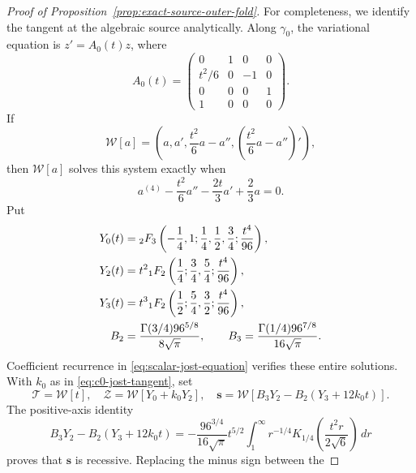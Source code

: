 \documentclass[11pt]{amsart}
\numberwithin{equation}{section}
\theoremstyle{definition}
\theoremstyle{remark}
\begin{document}
\begin{proof}[Proof of Proposition~\ref{prop:exact-source-outer-fold}]
For completeness, we identify the tangent at the algebraic source
analytically.  Along
$\gamma_0$, the variational equation is $z'=A_0(t)z$, where
\begin{equation}\label{eq:algebraic-variational-matrix}
 A_0(t)=
 \begin{pmatrix}
 0&1&0&0\\ t^2/6&0&-1&0\\
 0&0&0&1\\ 1&0&0&0
 \end{pmatrix}.
\end{equation}
If
\begin{equation}\label{eq:scalar-jost-lift}
 \mathcal W[a]=
 \left(a,a',\frac{t^2}{6}a-a'',
       \left(\frac{t^2}{6}a-a''\right)'\right),
\end{equation}
then $\mathcal W[a]$ solves this system exactly when
\begin{equation}\label{eq:scalar-jost-equation}
 a^{(4)}-\frac{t^2}{6}a''-\frac{2t}{3}a'
       +\frac23a=0.
\end{equation}
Put
\begin{align}
 Y_0(t)&={}_2F_3\left(
  -\frac14,1;\frac14,\frac12,\frac34;\frac{t^4}{96}\right),
 \notag\\
 Y_2(t)&=t^2{}_1F_2\left(
  \frac14;\frac34,\frac54;\frac{t^4}{96}\right),\notag\\
 Y_3(t)&=t^3{}_1F_2\left(
  \frac12;\frac54,\frac32;\frac{t^4}{96}\right),
 \label{eq:exact-jost-scalars}\\
 B_2&=\frac{\Gamma(3/4)96^{5/8}}{8\sqrt\pi},
 \qquad
 B_3=\frac{\Gamma(1/4)96^{7/8}}{16\sqrt\pi}.\notag
\end{align}
Coefficient recurrence in \eqref{eq:scalar-jost-equation} verifies these
entire solutions.  With $k_0$ as in \eqref{eq:c0-jost-tangent}, set
\begin{equation}\label{eq:exact-jost-basis}
 \mathcal T=\mathcal W[t],\quad
 \mathcal Z=\mathcal W[Y_0+k_0Y_2],\quad
 \mathbf s=\mathcal W[B_3Y_2-B_2(Y_3+12k_0t)].
\end{equation}
The positive-axis identity
\begin{equation}\label{eq:recessive-bessel-representation}
 B_3Y_2-B_2(Y_3+12k_0t)
 =-\frac{96^{3/4}}{16\sqrt\pi}t^{5/2}
   \int_1^\infty r^{-1/4}
     K_{1/4}\!\left(\frac{t^2r}{2\sqrt6}\right)\,dr
\end{equation}
proves that $\mathbf s$ is recessive.  Replacing the minus sign between the

\end{proof}
\end{document}
